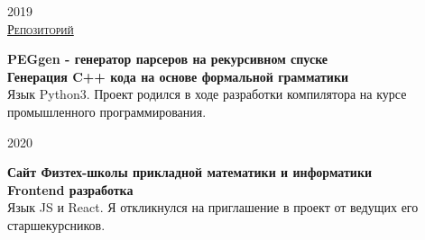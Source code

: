 \documentclass{article}
\newcommand{\entry}[3]{
    \begin{minipage}[t]{.11\linewidth}
        \hfill \textsc{#1}
    \end{minipage}
    \hfill\vline\hfill
    \begin{minipage}[t]{.80\linewidth}
        \textbf{#2}\\
        \footnotesize{#3}
    \end{minipage}
}
\begin{document}
    \vspace{.2cm}
    
    \entry {2019 \\
    \href {https://github.com/InversionSpaces/PEGgen} {Репозиторий} }
    {PEGgen - генератор парсеров на рекурсивном спуске \\
    Генерация C++ кода на основе формальной грамматики}
    {Язык Python3. Проект родился в ходе разработки компилятора на курсе промышленного программирования.} 
    
    \vspace{.2cm}
    
    \entry {2020}
    {Сайт Физтех-школы прикладной математики и информатики\\
    Frontend разработка}
    {Язык JS и React. Я откликнулся на приглашение в проект от ведущих его старшекурсников. }
\end{document}
